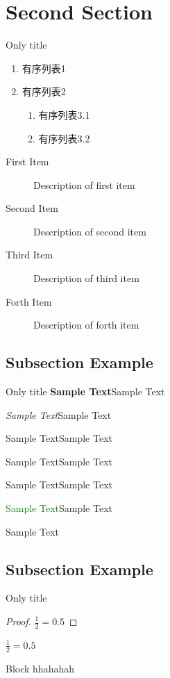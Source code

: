 \documentclass[12pt]{beamer}
\begin{document}
\section{Second Section}
\begin{frame}{Only title}
	\begin{enumerate}
		\item 有序列表1
		\item 有序列表2
		\begin{enumerate}
			\item 有序列表3.1
			\item 有序列表3.2
		\end{enumerate}
	\end{enumerate}

	\begin{description}
		\item[First Item] Description of first item
		\item[Second Item] Description of second item
		\item[Third Item] Description of third item
		\item[Forth Item] Description of forth item
	\end{description}

\end{frame}
\subsection{Subsection Example}
\begin{frame}{Only title}
\textbf{Sample Text}Sample Text\par
\textsl{Sample Text}Sample Text\par
\alert{Sample Text}Sample Text\par
\textrm{Sample Text}Sample Text\par
\textsf{Sample Text}Sample Text\par
\textcolor{green}{Sample Text}Sample Text\par
{}Sample Text\par
\end{frame}
\subsection{Subsection Example}
\begin{frame}{Only title}
	\begin{proof}
		$\frac{1}{2}=0.5$
	\end{proof}

	\begin{example}
		$\frac{1}{2}=0.5$
	\end{example}

	\begin{block}{Block}
		hhahahah
	\end{block}
\end{frame}
\end{document}
